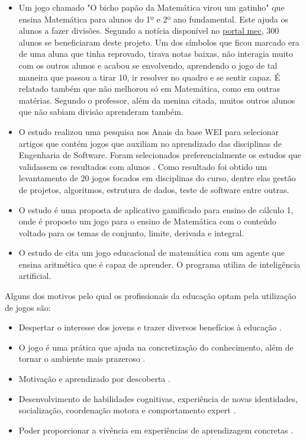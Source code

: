 \begin{itemize}
  \item Um jogo chamado "O bicho papão da Matemática virou um gatinho" que ensina Matemática para alunos do 1º e 2º ano fundamental. Este ajuda os alunos a fazer divisões. Segundo a notícia disponível no \href{http://portal.mec.gov.br/component/content/article?id=72701}{portal mec}, 300 alunos se beneficiaram deste projeto. Um dos símbolos que ficou marcado era de uma aluna que tinha reprovado, tirava notas baixas, não interagia muito com os outros alunos e acabou se envolvendo, aprendendo o jogo de tal maneira que passou a tirar 10, ir resolver no quadro e se sentir capaz. É relatado também que não melhorou só em Matemática, como em outras matérias. Segundo o professor, além da menina citada, muitos outros alunos que não sabiam divisão aprenderam também.


  \item O estudo \cite{sucessoJogoEngSoft} realizou uma pesquisa nos Anais da base WEI para selecionar artigos que contém jogos que auxiliam no aprendizado das disciplinas de Engenharia de Software. Foram selecionados preferencialmente os estudos que validassem os resultados com alunos \cite{sucessoJogoEngSoft}. Como resultado foi obtido um levantamento de 20 jogos focados em disciplinas do curso, dentre elas gestão de projetos, algoritmos, estrutura de dados, teste de software entre outras.

  \item O estudo \cite{appcalculo} é uma proposta de aplicativo gamificado para ensino de cálculo 1, onde é proposto um jogo para o ensino de Matemática com o conteúdo voltado para os temas de conjunto, limite, derivada e integral.

  \item O estudo de \cite{jogoSuporteMat} cita um jogo educacional de matemática com um agente que ensina aritmética que é capaz de aprender. O programa utiliza de inteligência artificial.   
\end{itemize}


Alguns dos motivos pelo qual os profissionais da educação optam pela utilização de jogos são:

\begin{itemize}
	\item Despertar o interesse dos jovens e trazer diversos benefícios à educação \cite{appcalculo}.
	\item O jogo é uma prática que ajuda na concretização do conhecimento, além de tornar o ambiente mais prazeroso \cite{jogoPratPedagoc}. 
	\item Motivação e aprendizado por descoberta .
	\item Desenvolvimento de habilidades cognitivas, experiência de novas identidades, socialização, coordenação motora e comportamento expert \cite[p. 3 e 4]{savi}.
	\item Poder proporcionar a vivência em experiências de aprendizagem concretas .
\end{itemize}

